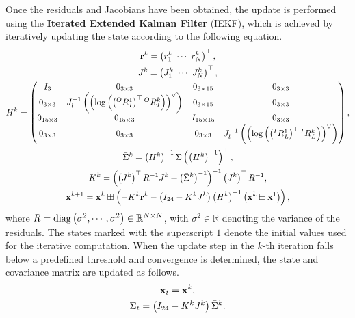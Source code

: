 Once the residuals and Jacobians have been obtained, the update is performed using the {\bf Iterated Extended Kalman Filter} (IEKF), which is achieved by iteratively updating the state according to the following equation.
%
\begin{align}
  \begin{gathered}
    {\bf r}^{k} = \left( r_{1}^{k} ~ \cdots ~ r_{N}^{k} \right)^{\top}, \\
%
    J^{k} = \left( J_{1}^{k} ~ \cdots ~ J_{N}^{k} \right)^{\top}, \\
%
    H^{k} = \left( \begin{matrix}
      I_{3} & 0_{3 \times 3} & 0_{3 \times 15} & 0_{3 \times 3} \\
%
      0_{3 \times 3} & J_{l}^{-1} \left( \left( \log \left( \left( {}^{O}R_{I}^{1} \right)^{\top} {}^{O}R_{I}^{k} \right) \right)^{\vee} \right) & 0_{3 \times 15} & 0_{3 \times 3} \\
%
      0_{15 \times 3} & 0_{15 \times 3} & I_{15 \times 15} & 0_{3 \times 3} \\
%
      0_{3 \times 3} & 0_{3 \times 3} & 0_{3 \times 3} & J_{l}^{-1} \left( \left( \log \left( \left( {}^{I}R_{L}^{1} \right)^{\top} {}^{I}R_{L}^{k} \right) \right)^{\vee} \right)
    \end{matrix} \right), \\
%
    \bar{ \Sigma }^{k} = \left( H^{k} \right)^{-1} \Sigma \left( \left( H^{k} \right)^{-1} \right)^{\top}, \\
%
    K^{k} = \left( \left( J^{k} \right)^{\top} R^{-1} J^{k} + \left( \bar{ \Sigma }^{k} \right)^{-1} \right)^{-1} \left( J^{k} \right)^{\top} R^{-1}, \\
%
    {\bf x}^{k+1} = {\bf x}^{k} \boxplus \left( -K^{k} {\bf r}^{k} - \left( I_{24} - K^{k} J^{k} \right) \left( H^{k} \right)^{-1} \left( {\bf x}^{k} \boxminus {\bf x}^{1} \right) \right),
  \end{gathered}
  \label{eq:iterated_extended_kalman_filter}
\end{align}
%
where $R = {\rm diag} \left( \sigma^{2}, \cdots, \sigma^{2} \right) \in \mathbb{R}^{N \times N}$, with $\sigma^{2} \in \mathbb{R}$ denoting the variance of the residuals.
The states marked with the superscript $1$ denote the initial values used for the iterative computation.
When the update step in the $k$-th iteration falls below a predefined threshold and convergence is determined, the state and covariance matrix are updated as follows.
%
\begin{align}
  \begin{gathered}
    {\bf x}_{t} = {\bf x}^{k}, \\
%
    \Sigma_{t} = \left( I_{24} - K^{k} J^{k} \right) \bar{ \Sigma }^{k}.
  \end{gathered}
\end{align}
%























